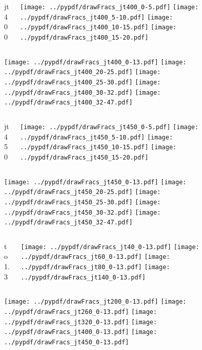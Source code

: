 \documentclass[aspectratio=169]{beamer}
\begin{document}
\begin{figure}[p]
\flushleft
\begin{columns}[T]
\begin{column}{.2\linewidth}
\centering
jt400
\end{column}
\begin{column}{.8\linewidth}
\texttt{[image: ../pypdf/drawFracs\_jt400\_0-5.pdf]}
\texttt{[image: ../pypdf/drawFracs\_jt400\_5-10.pdf]}
\texttt{[image: ../pypdf/drawFracs\_jt400\_10-15.pdf]}
\texttt{[image: ../pypdf/drawFracs\_jt400\_15-20.pdf]}
\end{column}
\end{columns}
\texttt{[image: ../pypdf/drawFracs\_jt400\_0-13.pdf]}
\texttt{[image: ../pypdf/drawFracs\_jt400\_20-25.pdf]}
\texttt{[image: ../pypdf/drawFracs\_jt400\_25-30.pdf]}
\texttt{[image: ../pypdf/drawFracs\_jt400\_30-32.pdf]}
\texttt{[image: ../pypdf/drawFracs\_jt400\_32-47.pdf]}
\end{figure}

\begin{figure}[p]
\flushleft
\begin{columns}[T]
\begin{column}{.2\linewidth}
\centering
jt450
\end{column}
\begin{column}{.8\linewidth}
\texttt{[image: ../pypdf/drawFracs\_jt450\_0-5.pdf]}
\texttt{[image: ../pypdf/drawFracs\_jt450\_5-10.pdf]}
\texttt{[image: ../pypdf/drawFracs\_jt450\_10-15.pdf]}
\texttt{[image: ../pypdf/drawFracs\_jt450\_15-20.pdf]}
\end{column}
\end{columns}
\texttt{[image: ../pypdf/drawFracs\_jt450\_0-13.pdf]}
\texttt{[image: ../pypdf/drawFracs\_jt450\_20-25.pdf]}
\texttt{[image: ../pypdf/drawFracs\_jt450\_25-30.pdf]}
\texttt{[image: ../pypdf/drawFracs\_jt450\_30-32.pdf]}
\texttt{[image: ../pypdf/drawFracs\_jt450\_32-47.pdf]}
\end{figure}

\begin{figure}[p]
\flushleft
\begin{columns}[T]
\begin{column}{.2\linewidth}
 to 1.3
\end{column}
\begin{column}{.8\linewidth}
\texttt{[image: ../pypdf/drawFracs\_jt40\_0-13.pdf]}
\texttt{[image: ../pypdf/drawFracs\_jt60\_0-13.pdf]}
\texttt{[image: ../pypdf/drawFracs\_jt80\_0-13.pdf]}
\texttt{[image: ../pypdf/drawFracs\_jt140\_0-13.pdf]}
\end{column}
\end{columns}
\texttt{[image: ../pypdf/drawFracs\_jt200\_0-13.pdf]}
\texttt{[image: ../pypdf/drawFracs\_jt260\_0-13.pdf]}
\texttt{[image: ../pypdf/drawFracs\_jt320\_0-13.pdf]}
\texttt{[image: ../pypdf/drawFracs\_jt400\_0-13.pdf]}
\texttt{[image: ../pypdf/drawFracs\_jt450\_0-13.pdf]}
\end{figure}
\end{document}
